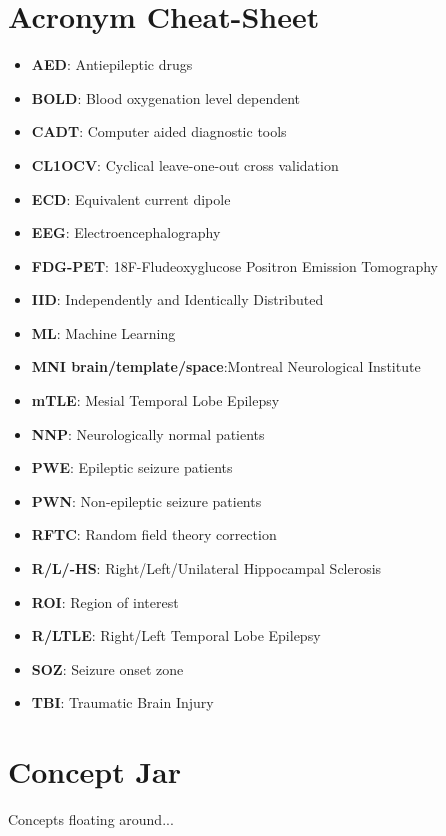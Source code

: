 \documentclass{article}
\begin{document}
    \section{Acronym Cheat-Sheet}
        \begin{itemize}
            \item \textbf{AED}: Antiepileptic drugs
            \item \textbf{BOLD}: Blood oxygenation level dependent
            \item \textbf{CADT}: Computer aided diagnostic tools
            \item \textbf{CL1OCV}: Cyclical leave-one-out cross validation
            \item \textbf{ECD}: Equivalent current dipole
            \item \textbf{EEG}: Electroencephalography
            \item \textbf{FDG-PET}: 18F-Fludeoxyglucose Positron Emission 
Tomography
            \item \textbf{IID}: Independently and Identically Distributed
            \item \textbf{ML}: Machine Learning
            \item \textbf{MNI brain/template/space}:Montreal Neurological
Institute
            \item \textbf{mTLE}: Mesial Temporal Lobe Epilepsy
            \item \textbf{NNP}: Neurologically normal patients
            \item \textbf{PWE}: Epileptic seizure patients
            \item \textbf{PWN}: Non-epileptic seizure patients
            \item \textbf{RFTC}: Random field theory correction
            \item \textbf{R/L/-HS}: Right/Left/Unilateral Hippocampal Sclerosis
            \item \textbf{ROI}: Region of interest
            \item \textbf{R/LTLE}: Right/Left Temporal Lobe Epilepsy
            \item \textbf{SOZ}: Seizure onset zone
            \item \textbf{TBI}: Traumatic Brain Injury
        \end{itemize}

    \section{Concept Jar}
        Concepts floating around...
\end{document}
